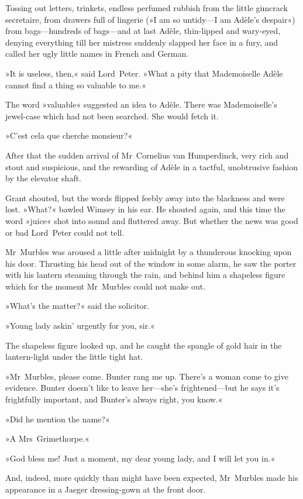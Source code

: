 Tossing out letters, trinkets, endless perfumed rubbish from the little gimcrack secretaire, from drawers full of lingerie (»I am so untidy—I am Adèle's despair«) from bags—hundreds of bags—and at last Adèle, thin-lipped and wary-eyed, denying everything till her mistress suddenly slapped her face in a fury, and called her ugly little names in French and German.

»It is useless, then,« said Lord~Peter. »What a pity that Mademoiselle Adèle cannot find a thing so valuable to me.«

The word »valuable« suggested an idea to Adèle. There was Mademoiselle's jewel-case which had not been searched. She would fetch it.

»C'est cela que cherche monsieur?«

After that the sudden arrival of Mr~Cornelius van Humperdinck, very rich and stout and suspicious, and the rewarding of Adèle in a tactful, unobtrusive fashion by the elevator shaft.

Grant shouted, but the words flipped feebly away into the blackness and were lost. »What?« bawled Wimsey in his ear. He shouted again, and this time the word »juice« shot into sound and fluttered away. But whether the news was good or bad Lord~Peter could not tell.

Mr~Murbles was aroused a little after midnight by a thunderous knocking upon his door. Thrusting his head out of the window in some alarm, he saw the porter with his lantern steaming through the rain, and behind him a shapeless figure which for the moment Mr~Murbles could not make out.

»What's the matter?« said the solicitor.

»Young lady askin' urgently for you, sir.«

The shapeless figure looked up, and he caught the spangle of gold hair in the lantern-light under the little tight hat.

»Mr~Murbles, please come. Bunter rang me up. There's a woman come to give evidence. Bunter doesn't like to leave her—she's frightened—but he says it's frightfully important, and Bunter's always right, you know.«

»Did he mention the name?«

»A Mrs~Grimethorpe.«

»God bless me! Just a moment, my dear young lady, and I will let you in.«

And, indeed, more quickly than might have been expected, Mr~Murbles made his appearance in a Jaeger dressing-gown at the front door.

